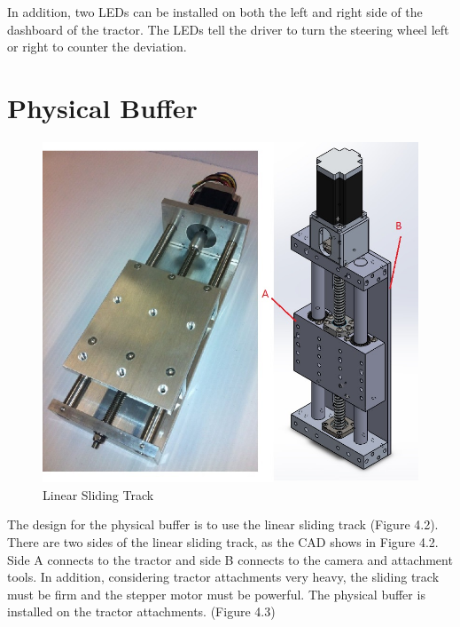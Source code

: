\documentclass[letterpaper,12pt,oneside]{book}
\begin{document}
		In addition, two LEDs can be installed on both the left and right side of the dashboard of the tractor. The LEDs tell the driver to turn the steering wheel left or right to counter the deviation. 
		
		
		\section{Physical Buffer}

		\begin{figure}[ht!]
			\begin{center}
				\includegraphics[scale = 0.6]{1D.jpg}
				\caption{Linear Sliding Track}
			\end{center}
		\end{figure}
		The design for the physical buffer is to use the linear sliding track (Figure 4.2). There are two sides of the linear sliding track, as the CAD shows in Figure 4.2. Side A connects to the tractor and side B connects to the camera and attachment tools. In addition, considering tractor attachments very heavy, the sliding track must be firm and the stepper motor must be powerful. The physical buffer is installed on the tractor attachments. (Figure 4.3)
\end{document}

